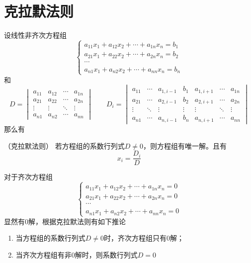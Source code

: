 \section{克拉默法则}
设线性非齐次方程组
\[
    \begin{cases}
        a_{11}x_1 + a_{12}x_2 + \cdots + a_{1n}x_n = b_1 \\
        a_{21}x_1 + a_{22}x_2 + \cdots + a_{2n}x_n = b_2 \\
        \cdots                                           \\
        a_{n1}x_1 + a_{n2}x_2 + \cdots + a_{nn}x_n = b_n
    \end{cases}
\]
和
\[
    D =
    \begin{vmatrix}
        a_{11} & a_{12} & \cdots & a_{1n} \\
        a_{21} & a_{22} & \cdots & a_{2n} \\
        \vdots & \vdots & \ddots & \vdots \\
        a_{n1} & a_{n2} & \cdots & a_{nn}
    \end{vmatrix}
    \qquad
    D_i =
    \begin{vmatrix}
        a_{11} & \cdots & a_{1,i-1} & b_1    & a_{1,i+1} & \cdots & a_{1n} \\
        a_{21} & \cdots & a_{2,i-1} & b_2    & a_{2,i+1} & \cdots & a_{2n} \\
        \vdots & \ddots & \vdots    & \vdots & \vdots    & \ddots & \vdots \\
        a_{n1} & \cdots & a_{n,i-1} & b_n    & a_{n,i+1} & \cdots & a_{nn}
    \end{vmatrix}
\]
那么有
\begin{theorem}
    （克拉默法则）
    \label{th:克拉默法则}
    若方程组的系数行列式$D\neq 0$，则方程组有唯一解。且有
    \[ x_i = \frac{D_i}{D} \]
\end{theorem}

对于齐次方程组
\[
    \begin{cases}
        a_{11}x_1 + a_{12}x_2 + \cdots + a_{1n}x_n = 0 \\
        a_{21}x_1 + a_{22}x_2 + \cdots + a_{2n}x_n = 0 \\
        \cdots                                         \\
        a_{n1}x_1 + a_{n2}x_2 + \cdots + a_{nn}x_n = 0
    \end{cases}
\]
显然有$0$解，根据克拉默法则有如下推论
\begin{enumerate}[(1)]
    \item 当方程组的系数行列式$D\neq 0$时，齐次方程组只有$0$解；
    \item 当齐次方程组有非$0$解时，则系数行列式$D=0$
\end{enumerate}

